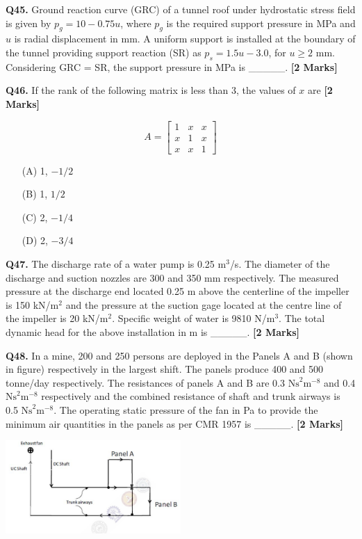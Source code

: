 \documentclass[11pt]{article}
\newcommand{\questionb}[2]{
    \noindent\textbf{Q#2.} #1 \hfill \textbf{[2 Marks]}
}
\begin{document}
\questionb{Ground reaction curve (GRC) of a tunnel roof under hydrostatic stress field is given by $p_g = 10 - 0.75u$, where $p_g$ is the required support pressure in MPa and $u$ is radial displacement in mm. A uniform support is installed at the boundary of the tunnel providing support reaction (SR) as $p_s = 1.5u - 3.0$, for $u \geq 2$ mm. Considering GRC = SR, the support pressure in MPa is \_\_\_\_\_.}{45}
\vspace{0.5cm}

\questionb{If the rank of the following matrix is less than 3, the values of \( x \) are}{46}

\[
A = \begin{bmatrix} 
1 & x & x \\ 
x & 1 & x \\ 
x & x & 1 
\end{bmatrix}
\]

\begin{enumerate}
    \item[(A)] 1, \(-1/2\)  
    \item[(B)] 1, \(1/2\)  
    \item[(C)] 2, \(-1/4\)  
    \item[(D)] 2, \(-3/4\)
\end{enumerate}
\vspace{0.5cm}

\questionb{The discharge rate of a water pump is 0.25 m\(^3\)/s. The diameter of the discharge and suction nozzles are 300 and 350 mm respectively. The measured pressure at the discharge end located 0.25 m above the centerline of the impeller is 150 kN/m\(^2\) and the pressure at the suction gage located at the centre line of the impeller is 20 kN/m\(^2\). Specific weight of water is 9810 N/m\(^3\). The total dynamic head for the above installation in m is \_\_\_\_\_.}{47}
\vspace{0.5cm}

\questionb{In a mine, 200 and 250 persons are deployed in the Panels A and B (shown in figure) respectively in the largest shift. The panels produce 400 and 500 tonne/day respectively. The resistances of panels A and B are 0.3 \( \text{Ns}^2\text{m}^{-8} \) and 0.4 \( \text{Ns}^2\text{m}^{-8} \) respectively and the combined resistance of shaft and trunk airways is 0.5 \( \text{Ns}^2\text{m}^{-8} \). The operating static pressure of the fan in Pa to provide the minimum air quantities in the panels as per CMR 1957 is \_\_\_\_\_.}{48}

\begin{center}
\includegraphics[width=0.5\textwidth]{figures/48.png}
\end{center}
\vspace{0.5cm}
\end{document}
